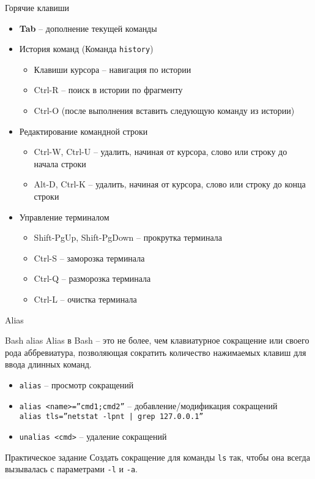 \begin{frame}{Горячие клавиши}
  \begin{itemize}
    \item \textbf{Tab} -- дополнение текущей команды
      \pause
    \item История команд (Команда {\tt history})
      \begin{itemize}
        \item Клавиши курсора -- навигация по истории
        \item Ctrl-R -- поиск в истории по фрагменту
        \item Ctrl-O (после выполнения вставить следующую команду из истории)
      \end{itemize}
    \item Редактирование командной строки
      \begin{itemize}
        \item Ctrl-W, Ctrl-U -- удалить, начиная от курсора, слово или строку до начала строки
        \item Alt-D, Ctrl-K -- удалить, начиная от курсора, слово или строку до конца строки
      \end{itemize}
    \item Управление терминалом
      \begin{itemize}
        \item Shift-PgUp, Shift-PgDown -- прокрутка терминала
        \item Ctrl-S -- заморозка терминала
        \item Ctrl-Q -- разморозка терминала
        \item Ctrl-L -- очистка терминала
      \end{itemize}
  \end{itemize}
\end{frame}

\begin{frame}{Alias}
  \begin{block}{Bash alias}
    Alias в Bash -- это не более, чем клавиатурное сокращение или своего рода аббревиатура, 
    позволяющая сократить количество нажимаемых клавиш для ввода длинных команд.

    \begin{itemize}
        \item {\tt alias} -- просмотр сокращений
	\item {\tt alias <name>=''cmd1;cmd2''} -- добавление/модификация сокращений \\
	      {\tt alias tls=''netstat -lpnt | grep 127.0.0.1''}
        \item {\tt unalias <cmd>} -- удаление сокращений
    \end{itemize}
  \end{block}

  \pause
  \begin{block}{Практическое задание}
  Создать сокращение для команды {\tt ls} так, чтобы она всегда вызывалась с параметрами {\tt -l} и {\tt -a}.
  \end{block}

\end{frame}
